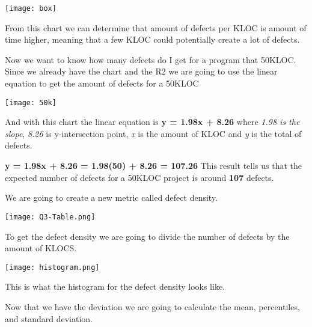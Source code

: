 \begin{center}
    \texttt{[image: box]}    
\end{center}
\noindent
From this chart we can determine that amount of defects per KLOC is amount of time higher, meaning that a few KLOC could potentially create a lot of defects.

\pagebreak
\noindent
Now we want to know how many defects do I get for a program that 50KLOC.
\noindent\newline \newline 
Since we already have the chart and the R2 we are going to use the linear equation to get the amount of defects for a 50KLOC

\begin{center}
    \texttt{[image: 50k]}    
\end{center}

\noindent\newline 
And with this chart the linear equation is \textbf{y = 1.98x + 8.26} where \textit{1.98 is the slope}, \textit{8.26} is y-intersection point, \textit{x} is the amount of KLOC and \textit{y} is the total of defects.

\noindent\newline \newline
\textbf{y = 1.98x + 8.26 = 1.98(50) + 8.26 = 107.26}
\noindent\newline\newline 
This result tells us that the expected number of defects for a 50KLOC project is around \textbf{107} defects.

\pagebreak

\noindent
We are going to create a new metric called defect density.

\begin{center}
    \texttt{[image: Q3-Table.png]}    
\end{center}

\noindent
To get the defect density we are going to divide the number of defects by the amount of KLOCS.

\begin{center}
    \texttt{[image: histogram.png]}    
\end{center}

\noindent
This is what the histogram for the defect density looks like.

\pagebreak
\noindent
Now that we have the deviation we are going to calculate the mean, percentiles, and standard deviation.

